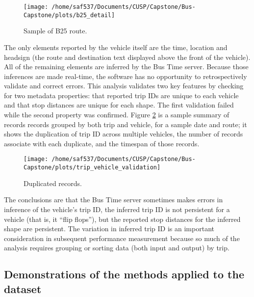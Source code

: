 \documentclass[12pt]{report}
\begin{document}
\begin{figure}[!ht]
\label{b26}
  \caption{Sample of B25 route.}
  \centering
    \texttt{[image: /home/saf537/Documents/CUSP/Capstone/Bus-Capstone/plots/b25\_detail]}
\end{figure}

The only elements reported by the vehicle itself are the time, location and headsign (the route and destination text displayed above the front of the vehicle).  All of the remaining elements are inferred by the Bus Time server.  Because those inferences are made real-time, the software has no opportunity to retrospectively validate and correct errors.  This analysis validates two key features by checking for two metadata properties: that reported trip IDs are unique to each vehicle and that stop distances are unique for each shape.  The first validation failed while the second property was confirmed.  Figure \ref{trip_val} is a sample summary of records records grouped by both trip and vehicle, for a sample date and route; it shows the duplication of trip ID across multiple vehicles, the number of records associate with each duplicate, and the timespan of those records.


\begin{figure}[!ht]
\label{trip_val}
  \caption{Duplicated records.}
  \centering
    \texttt{[image: /home/saf537/Documents/CUSP/Capstone/Bus-Capstone/plots/trip\_vehicle\_validation]}
\end{figure}

The conclusions are that the Bus Time server sometimes makes errors in inference of the vehicle's trip ID, the inferred trip ID is not persistent for a vehicle (that is, it “flip flops”), but the reported stop distances for the inferred shape are persistent.  The variation in inferred trip ID is an important consideration in subsequent performance measurement because so much of the analysis requires grouping or sorting data (both input and output) by trip.




\subsection{Demonstrations of the methods applied to the dataset}
\end{document}
